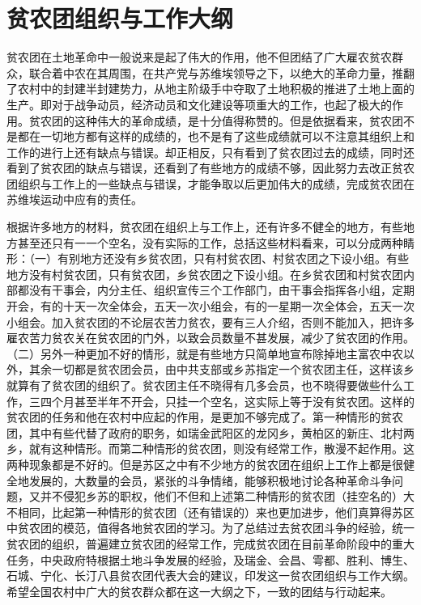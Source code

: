\section[贫农团组织与工作大纲（一九三三年七月十五日）]{贫农团组织与工作大纲}


贫农团在土地革命中一般说来是起了伟大的作用，他不但团结了广大雇农贫农群众，联合着中农在其周围，在共产党与苏维埃领导之下，以绝大的革命力量，推翻了农村中的封建半封建势力，从地主阶级手中夺取了土地积极的推进了土地上面的生产。即对于战争动员，经济动员和文化建设等项重大的工作，也起了极大的作用。贫农团的这种伟大的革命成绩，是十分值得称赞的。但是依据看来，贫农团不是都在一切地方都有这样的成绩的，也不是有了这些成绩就可以不注意其组织上和工作的进行上还有缺点与错误。却正相反，只有看到了贫农团过去的成绩，同时还看到了贫农团的缺点与错误，还看到了有些地方的成绩不够，因此努力去改正贫农团组织与工作上的一些缺点与错误，才能争取以后更加伟大的成绩，完成贫农团在苏维埃运动中应有的责任。

根据许多地方的材料，贫农团在组织上与工作上，还有许多不健全的地方，有些地方甚至还只有一一个空名，没有实际的工作，总括这些材料看来，可以分成两种睛形：（一）有别地方还没有乡贫农团，只有村贫农团、村贫农团之下设小组。有些地方没有村贫农团，只有贫农团，乡贫农团之下设小组。在乡贫农团和村贫农团内部都没有干事会，内分主任、组织宣传三个工作部门，由干事会指挥各小组，定期开会，有的十天一次全体会，五天一次小组会，有的一星期一次全体会，五天一次小组会。加入贫农团的不论层农苦力贫农，要有三人介绍，否则不能加入，把许多雇农苦力贫农关在贫农团的门外，以致会员数量不甚发展，减少了贫农团的作用。（二）另外一种更加不好的情形，就是有些地方只简单地宣布除掉地主富农中农以外，其余一切都是贫农团会员，由中共支部或乡苏指定一个贫农团主任，这样该乡就算有了贫农团的组织了。贫农团主任不晓得有几多会员，也不晓得要做些什么工作，三四个月甚至半年不开会，只挂一个空名，这实际上等于没有贫农团。这样的贫农团的任务和他在农村中应起的作用，是更加不够完成了。第一种情形的贫农团，其中有些代替了政府的职务，如瑞金武阳区的龙冈乡，黄柏区的新庄、北村两乡，就有这种情形。而第二种情形的贫农团，则没有经常工作，散漫不起作用。这两种现象都是不好的。但是苏区之中有不少地方的贫农团在组织上工作上都是很健全地发展的，大数量的会员，紧张的斗争情绪，能够积极地讨论各种革命斗争问题，又并不侵犯乡苏的职权，他们不但和上述第二种情形的贫农团（挂空名的）大不相同，比起第一种情形的贫农团（还有错误的）来也更加进步，他们真算得苏区中贫农团的模范，值得各地贫农团的学习。为了总结过去贫农团斗争的经验，统一贫农团的组织，普遍建立贫农团的经常工作，完成贫农团在目前革命阶段中的重大任务，中央政府特根据土地斗争发展的经验，及瑞金、会昌、雩都、胜利、博生、石城、宁化、长汀八县贫农团代表大会的建议，印发这一贫农团组织与工作大纲。希望全国农村中广大的贫农群众都在这一大纲之下，一致的团结与行动起来。

